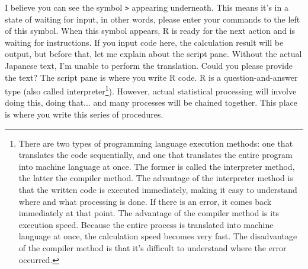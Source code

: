\documentclass{ltjsbook}
\begin{document}
I believe you can see the symbol \texttt{>} appearing underneath. This means it's in a state of waiting for input, in other words, please enter your commands to the left of this symbol. When this symbol appears, R is ready for the next action and is waiting for instructions. If you input code here, the calculation result will be output, but before that, let me explain about the script pane.
Without the actual Japanese text, I'm unable to perform the translation. Could you please provide the text?
The script pane is where you write R code. R is a question-and-answer type (also called interpreter\footnote{There are two types of programming language execution methods: one that translates the code sequentially, and one that translates the entire program into machine language at once. The former is called the interpreter method, the latter the compiler method. The advantage of the interpreter method is that the written code is executed immediately, making it easy to understand where and what processing is done. If there is an error, it comes back immediately at that point. The advantage of the compiler method is its execution speed. Because the entire process is translated into machine language at once, the calculation speed becomes very fast. The disadvantage of the compiler method is that it's difficult to understand where the error occurred.}). However, actual statistical processing will involve doing this, doing that... and many processes will be chained together. This place is where you write this series of procedures.
\end{document}

